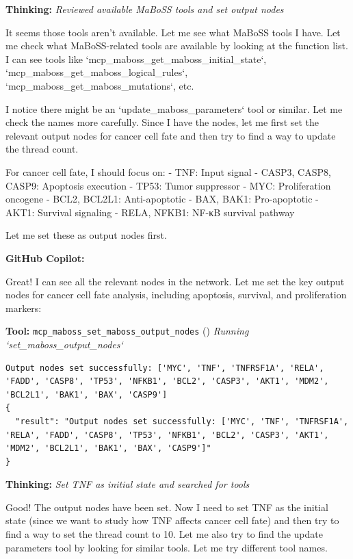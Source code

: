 \documentclass[11pt,a4paper]{article}
\begin{document}
\begin{thinkbox}
\textbf{Thinking:} \textit{Reviewed available MaBoSS tools and set output nodes}

It seems those tools aren't available. Let me see what MaBoSS tools I have. Let me check what MaBoSS-related tools are available by looking at the function list. I can see tools like `mcp\_maboss\_get\_maboss\_initial\_state`, `mcp\_maboss\_get\_maboss\_logical\_rules`, `mcp\_maboss\_get\_maboss\_mutations`, etc.

I notice there might be an `update\_maboss\_parameters` tool or similar. Let me check the names more carefully. Since I have the nodes, let me first set the relevant output nodes for cancer cell fate and then try to find a way to update the thread count.

For cancer cell fate, I should focus on:
- TNF: Input signal
- CASP3, CASP8, CASP9: Apoptosis execution  
- TP53: Tumor suppressor
- MYC: Proliferation oncogene
- BCL2, BCL2L1: Anti-apoptotic  
- BAX, BAK1: Pro-apoptotic
- AKT1: Survival signaling
- RELA, NFKB1: NF-κB survival pathway

Let me set these as output nodes first.

\end{thinkbox}
\begin{copilotbox}
\textbf{GitHub Copilot:}

Great! I can see all the relevant nodes in the network. Let me set the key output nodes for cancer cell fate analysis, including apoptosis, survival, and proliferation markers:

\end{copilotbox}
\begin{toolokbox}
\textbf{Tool:} \texttt{mcp\_maboss\_set\_maboss\_output\_nodes} (\checkmark)
\textit{Running `set\_maboss\_output\_nodes`}
\begin{lstlisting}
Output nodes set successfully: ['MYC', 'TNF', 'TNFRSF1A', 'RELA', 'FADD', 'CASP8', 'TP53', 'NFKB1', 'BCL2', 'CASP3', 'AKT1', 'MDM2', 'BCL2L1', 'BAK1', 'BAX', 'CASP9']
{
  "result": "Output nodes set successfully: ['MYC', 'TNF', 'TNFRSF1A', 'RELA', 'FADD', 'CASP8', 'TP53', 'NFKB1', 'BCL2', 'CASP3', 'AKT1', 'MDM2', 'BCL2L1', 'BAK1', 'BAX', 'CASP9']"
}
\end{lstlisting}
\end{toolokbox}
\begin{thinkbox}
\textbf{Thinking:} \textit{Set TNF as initial state and searched for tools}

Good! The output nodes have been set. Now I need to set TNF as the initial state (since we want to study how TNF affects cancer cell fate) and then try to find a way to set the thread count to 10. Let me also try to find the update parameters tool by looking for similar tools. Let me try different tool names.

\end{thinkbox}
\end{document}
